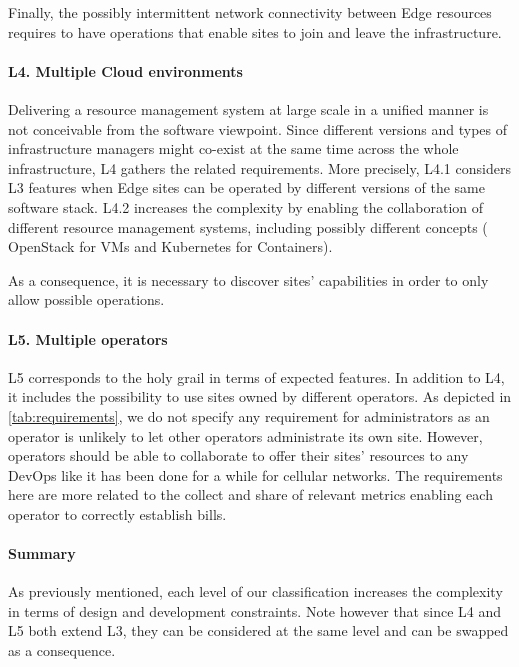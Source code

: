 Finally, the possibly intermittent network connectivity between Edge resources
requires to have operations that enable sites to join and leave the
infrastructure.


\paragraph{L4. Multiple Cloud environments}
Delivering a resource management system at large scale in a unified manner is
not conceivable from the software viewpoint. Since different versions and types
of infrastructure managers might co-exist at the same time across the whole
infrastructure, L4 gathers the related requirements.
%
More precisely, L4.1 considers L3 features when Edge sites can be operated by
different versions of the same software stack.
%
L4.2 increases the complexity by enabling the collaboration of different
resource management systems, including possibly different concepts (\eg
OpenStack for VMs and Kubernetes for Containers).

As a consequence, it is necessary to discover sites' capabilities in order to
only allow possible operations.

\paragraph{L5. Multiple operators}
L5 corresponds to the holy grail in terms of expected features. In addition to
L4, it includes the possibility to use sites owned by different operators. As
depicted in \cref{tab:requirements}, we do not specify any requirement for
administrators as an operator is unlikely to let other operators administrate
its own site. However, operators should be able to collaborate to offer their
sites' resources to any DevOps like it has been done for a while for cellular
networks. The requirements here are more related to the collect and share of
relevant metrics enabling each operator to correctly establish bills.

\paragraph{Summary}
As previously mentioned, each level of our classification increases the
complexity in terms of design and development constraints. Note however that
since L4 and L5 both extend L3, they can be considered at the same level and
can be swapped as a consequence.

